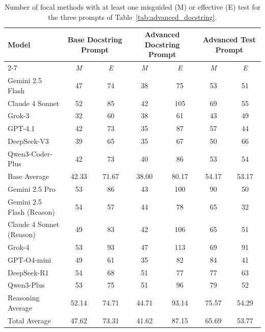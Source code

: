 \documentclass[acmsmall]{acmart}
\begin{document}
\begin{table}[htbp!]
\centering
\tiny
\caption{Number of focal methods with at least one misguided (M) or effective (E) test for the three prompts of Table~\ref{tab:advanced_docstring}.}
\label{tab:advanced_docstring_improve_method}
\begin{tabular}{l|cc|cc|cc}
\toprule
\multirow{2}{*}{\textbf{Model}} & \multicolumn{2}{c|}{\textbf{Base Docstring Prompt}} & \multicolumn{2}{c|}{\textbf{Advanced Docstring Prompt}} & \multicolumn{2}{c}{\textbf{Advanced Test Prompt}} \\
\cmidrule{2-7}
 & \emph{M} & \emph{E} & \emph{M} & \emph{E} & \emph{M} & \emph{E} \\
\midrule
Gemini 2.5 Flash & 47 & 74 & 38 & 75 & 53 & 51 \\
Claude 4 Sonnet & 52 & 85 & 42 & 105 & 69 & 55 \\
Grok-3 & 32 & 60 & 38 & 61 & 43 & 49 \\
GPT-4.1 & 42 & 73 & 35 & 87 & 57 & 44 \\
DeepSeek-V3 & 39 & 65 & 35 & 67 & 50 & 66 \\
Qwen3-Coder-Plus & 42 & 73 & 40 & 86 & 53 & 54 \\
\midrule
Base Average & 42.33 & 71.67 & 38.00 & 80.17 & 54.17 & 53.17 \\
\midrule
\midrule
Gemini 2.5 Pro & 53 & 86 & 43 & 100 & 90 & 50 \\
Gemini 2.5 Flash (Reason) & 54 & 57 & 44 & 78 & 65 & 32 \\
Claude 4 Sonnet (Reason) & 49 & 83 & 42 & 106 & 65 & 51 \\
Grok-4 & 53 & 93 & 47 & 113 & 69 & 91 \\
GPT-O4-mini & 49 & 61 & 35 & 82 & 84 & 41 \\
DeepSeek-R1 & 54 & 68 & 51 & 77 & 77 & 63 \\
Qwen3-Plus & 53 & 75 & 51 & 96 & 79 & 52 \\
\midrule
Reasoning Average & 52.14 & 74.71 & 44.71 & 93.14 & 75.57 & 54.29 \\
\midrule
Total Average & 47.62 & 73.31 & 41.62 & 87.15 & 65.69 & 53.77 \\
\bottomrule
\end{tabular}
\end{table}
\end{document}
